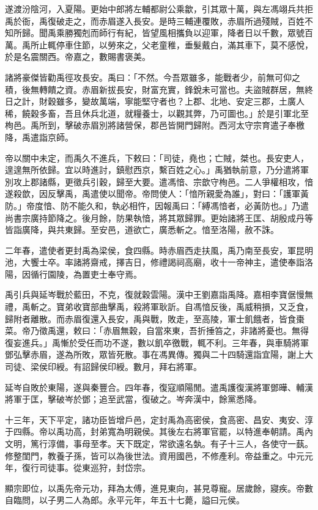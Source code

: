 \begin{pinyinscope}
遂渡汾陰河，入夏陽。更始中郎將左輔都尉公乘歙，引其眾十萬，與左馮翊兵共拒禹於衙，禹復破走之，而赤眉遂入長安。是時三輔連覆敗，赤眉所過殘賊，百姓不知所歸。聞禹乘勝獨剋而師行有紀，皆望風相攜負以迎軍，降者日以千數，眾號百萬。禹所止輒停車住節，以勞來之，父老童稚，垂髮戴白，滿其車下，莫不感悅，於是名震關西。帝嘉之，數賜書褒美。

諸將豪傑皆勸禹徑攻長安。禹曰：「不然。今吾眾雖多，能戰者少，前無可仰之積，後無轉饋之資。赤眉新拔長安，財富充實，鋒銳未可當也。夫盜賊群居，無終日之計，財穀雖多，變故萬端，寧能堅守者也？上郡、北地、安定三郡，土廣人稀，饒穀多畜，吾且休兵北道，就糧養士，以觀其弊，乃可圖也。」於是引軍北至栒邑。禹所到，擊破赤眉別將諸營保，郡邑皆開門歸附。西河太守宗育遣子奉檄降，禹遣詣京師。

帝以關中未定，而禹久不進兵，下敕曰：「司徒，堯也；亡賊，桀也。長安吏人，遑遑無所依歸。宜以時進討，鎮慰西京，繫百姓之心。」禹猶執前意，乃分遣將軍別攻上郡諸縣，更徵兵引穀，歸至大要。遣馮愔、宗歆守栒邑。二人爭權相攻，愔遂殺歆，因反擊禹，禹遣使以聞帝。帝問使人：「愔所親愛為誰」，對曰：「護軍黃防。」帝度愔、防不能久和，執必相忤，因報禹曰：「縛馮愔者，必黃防也。」乃遣尚書宗廣持節降之。後月餘，防果執愔，將其眾歸罪。更始諸將王匡、胡殷成丹等皆詣廣降，與共東歸。至安邑，道欲亡，廣悉斬之。愔至洛陽，赦不誅。

二年春，遣使者更封禹為梁侯，食四縣。時赤眉西走扶風，禹乃南至長安，軍昆明池，大饗士卒。率諸將齋戒，擇吉日，修禮謁祠高廟，收十一帝神主，遣使奉詣洛陽，因循行園陵，為置吏士奉守焉。

禹引兵與延岑戰於藍田，不克，復就穀雲陽。漢中王劉嘉詣禹降。嘉相李寶倨慢無禮，禹斬之。寶弟收寶部曲擊禹，殺將軍耿訢。自馮愔反後，禹威稍損，又乏食，歸附者離散。而赤眉復還入長安，禹與戰，敗走，至高陵，軍士飢餓者，皆食棗菜。帝乃徵禹還，敕曰：「赤眉無穀，自當來東，吾折捶笞之，非諸將憂也。無得復妄進兵。」禹慚於受任而功不遂，數以飢卒徼戰，輒不利。三年春，與車騎將軍鄧弘擊赤眉，遂為所敗，眾皆死散。事在馮異傳。獨與二十四騎還詣宜陽，謝上大司徒、梁侯印綬。有詔歸侯印綬。數月，拜右將軍。

延岑自敗於東陽，遂與秦豐合。四年春，復寇順陽閒。遣禹護復漢將軍鄧曄、輔漢將軍于匡，擊破岑於鄧；追至武當，復破之。岑奔漢中，餘黨悉降。

十三年，天下平定，諸功臣皆增戶邑，定封禹為高密侯，食高密、昌安、夷安、淳于四縣。帝以禹功高，封弟寬為明親侯。其後左右將軍官罷，以特進奉朝請。禹內文明，篤行淳備，事母至孝。天下既定，常欲遠名埶。有子十三人，各使守一蓺。修整閨門，教養子孫，皆可以為後世法。資用國邑，不修產利。帝益重之。中元元年，復行司徒事。從東巡狩，封岱宗。

顯宗即位，以禹先帝元功，拜為太傅，進見東向，甚見尊寵。居歲餘，寢疾。帝數自臨問，以子男二人為郎。永平元年，年五十七薨，謚曰元侯。


\end{pinyinscope}
